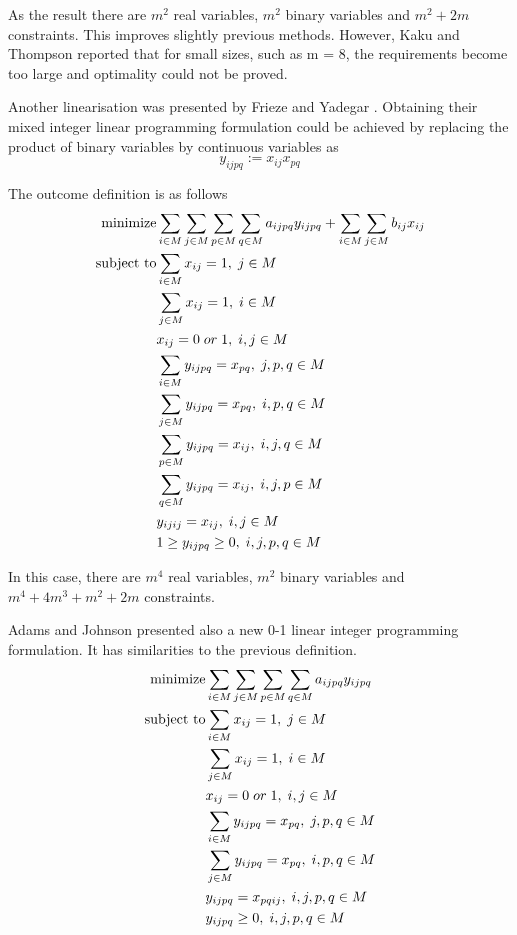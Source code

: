 \documentclass[english,a4paper,twoside]{ppfcmthesis}
\begin{document}
As the result there are $m^2$ real variables, $m^2$ binary variables and $m^2 + 2m$ constraints.
This improves slightly previous methods.
However, Kaku and Thompson \cite{kaku1986exact} reported that for small sizes, such as m = 8, the requirements become too large and optimality could not be proved.

Another linearisation was presented by Frieze and Yadegar \cite{frieze1983quadratic}.
Obtaining their mixed integer linear programming formulation could be achieved by replacing the product of binary variables by continuous variables as
\begin{equation}
  y_{ijpq} := x_{ij} x_{pq}
\end{equation}

The outcome definition is as follows
\begin{align}
  \text{minimize} &\null \sum_{i \in M} \sum_{j \in M} \sum_{p \in M} \sum_{q \in M} a_{ijpq}y_{ijpq} + \sum_{i \in M} \sum_{j \in M} b_{ij} x_{ij} \\
  \text{subject to} &\null \sum_{i \in M} x_{ij} = 1, \; j \in M \\
  &\null \sum_{j \in M} x_{ij} = 1, \; i \in M \\
  &\null x_{ij} = 0 \; or \; 1, \; i, j \in M \\
  &\null \sum_{i \in M} y_{ijpq} = x_{pq}, \; j, p, q \in M \\
  &\null \sum_{j \in M} y_{ijpq} = x_{pq}, \; i, p, q \in M \\
  &\null \sum_{p \in M} y_{ijpq} = x_{ij}, \; i, j, q \in M \\
  &\null \sum_{q \in M} y_{ijpq}= x_{ij}, \; i, j, p \in M \\
  &\null y_{ijij} = x_{ij}, \; i, j \in M \\
  &\null 1 \geq y_{ijpq} \geq 0, \; i, j, p, q \in M
\end{align}

In this case, there are $m^4$ real variables, $m^2$ binary variables and $m^4 + 4m^3+m^2+2m$ constraints.

Adams and Johnson \cite{adams1994improved} presented also a new 0-1 linear integer programming formulation.
It has similarities to the previous definition.
\begin{align}
  \text{minimize} &\null \sum_{i \in M} \sum_{j \in M} \sum_{p \in M} \sum_{q \in M} a_{ijpq}y_{ijpq} \\
  \text{subject to} &\null \sum_{i \in M} x_{ij} = 1, \; j \in M \\
  &\null \sum_{j \in M} x_{ij} = 1, \; i \in M \\
  &\null x_{ij} = 0 \; or \; 1, \; i, j \in M \\
  &\null \sum_{i \in M} y_{ijpq} = x_{pq}, \; j, p, q \in M \\
  &\null \sum_{j \in M} y_{ijpq} = x_{pq}, \; i, p, q \in M \\
  &\null y_{ijpq} = x_{pqij}, \; i, j, p, q \in M \\
  &\null y_{ijpq} \geq 0, \; i, j, p, q \in M
\end{align}
\end{document}
